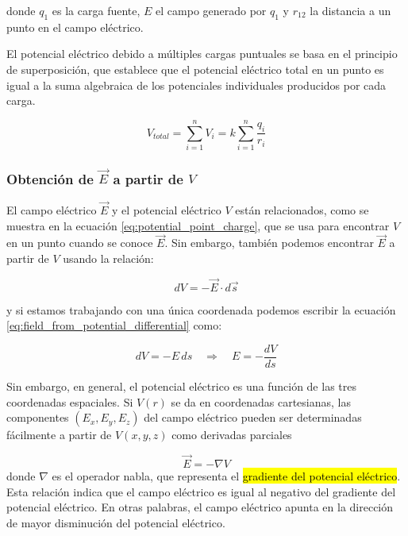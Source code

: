 donde \(q_1\) es la carga fuente, \(E\) el campo generado por \(q_1\) y \(r_{12}\) la distancia a un punto en el campo eléctrico.

El potencial eléctrico debido a múltiples cargas puntuales se basa en el principio de superposición, que establece que el potencial eléctrico total en un punto es igual a la suma algebraica de los potenciales individuales producidos por cada carga.

\begin{equation}
    V_{total} = \sum_{i=1}^{n} V_i = k \sum_{i=1}^{n} \frac{q_i}{r_i}
\end{equation}

\subsubsection{Obtención de \(\vec{E}\) a partir de \(V\)}

El campo eléctrico \(\vec{E}\) y el potencial eléctrico \(V\) están relacionados, como se muestra en la ecuación \eqref{eq:potential_point_charge}, que se usa para encontrar \(V\) en un punto cuando se conoce \(\vec{E}\). Sin embargo, también podemos encontrar \(\vec{E}\) a partir de \(V\) usando la relación:

\begin{equation}
    dV = -\vec{E} \cdot d\vec{s}
    \label{eq:field_from_potential_differential}
\end{equation}

y si estamos trabajando con una única coordenada podemos escribir la ecuación \eqref{eq:field_from_potential_differential} como:

\[
    dV = -E \, ds \quad \Rightarrow \quad E = -\frac{dV}{ds}
\]

Sin embargo, en general, el potencial eléctrico es una función de las tres coordenadas espaciales. Si \(V(r)\) se da en coordenadas cartesianas, las componentes \((E_x, E_y, E_z)\) del campo eléctrico pueden ser determinadas fácilmente a partir de \(V(x, y, z)\) como derivadas parciales

\begin{equation}
    \vec{E} = -\nabla V
    \label{eq:field_from_potential}
\end{equation}
donde \(\nabla\) es el operador nabla, que representa el \hl{gradiente del potencial eléctrico}. Esta relación indica que el campo eléctrico es igual al negativo del gradiente del potencial eléctrico. En otras palabras, el campo eléctrico apunta en la dirección de mayor disminución del potencial eléctrico.

